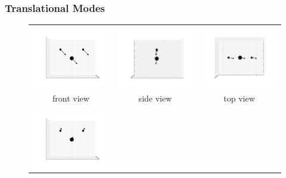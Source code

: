 \documentclass[11pt]{article}
\begin{document}
\subsubsection{Translational Modes}
\label{trans}
\begin{figure}[htp]
	\centering
	\begin{tabular}{|ccc|}\hline&&\\
	\includegraphics[width=5.5cm,clip=true,trim=3cm 2cm 3cm 2cm]{images/0-0_0.pdf}&
	\includegraphics[width=5.5cm,clip=true,trim=3cm 2cm 3cm 2cm]{images/0-90_0.pdf}&
	\includegraphics[width=5.5cm,clip=true,trim=3cm 2cm 3cm 2cm]{images/90-0_0.pdf}\\front view&side view&top view\\\hline&&\\
	\includegraphics[width=5.5cm,clip=true,trim=3cm 2cm 3cm 2cm]{images/0-0_1.pdf}&

\end{tabular}
\end{figure}
\end{document}
